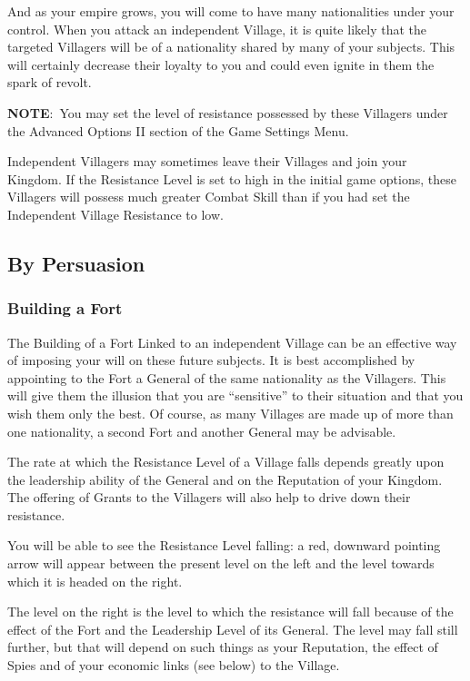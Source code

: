 And as your empire grows, you will come to have many nationalities under your control. When you attack an independent Village, it is quite likely that the targeted Villagers will be of a nationality shared by many of your subjects. This will certainly decrease their loyalty to you and could even ignite in them the spark of revolt.

\textbf{NOTE}: You may set the level of resistance possessed by these Villagers under the Advanced Options II section of the Game Settings Menu.

Independent Villagers may sometimes leave their Villages and join your Kingdom. If the Resistance Level is set to high in the initial game options, these Villagers will possess much greater Combat Skill than if you had set the Independent Village Resistance to low.

\subsection{By Persuasion}

\subsubsection{Building a Fort}

The Building of a Fort Linked to an independent Village can be an effective way of imposing your will on these future subjects. It is best accomplished by appointing to the Fort a General of the same nationality as the Villagers. This will give them the illusion that you are “sensitive” to their situation and that you wish them only the best. Of course, as many Villages are made up of more than one nationality, a second Fort and another General may be advisable.

The rate at which the Resistance Level of a Village falls depends greatly upon the leadership ability of the General and on the Reputation of your Kingdom. The offering of Grants to the Villagers will also help to drive down their resistance.

You will be able to see the Resistance Level falling: a red, downward pointing arrow will appear between the present level on the left and the level towards which it is headed on the right.

The level on the right is the level to which the resistance will fall because of the effect of the Fort and the Leadership Level of its General. The level may fall still further, but that will depend on such things as your Reputation, the effect of Spies and of your economic links (see below) to the Village.

